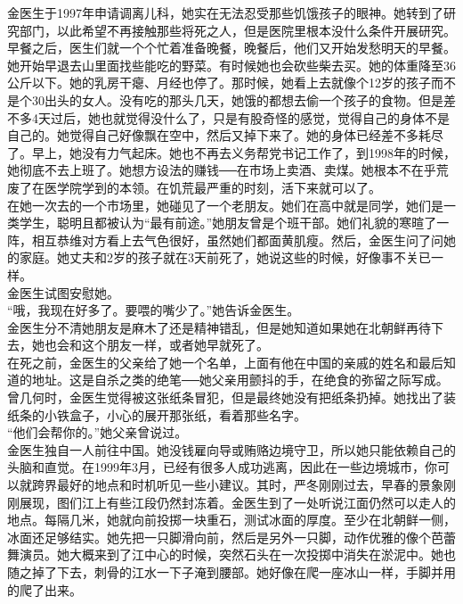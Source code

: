 金医生于1997年申请调离儿科，她实在无法忍受那些饥饿孩子的眼神。她转到了研究部门，以此希望不再接触那些将死之人，但是医院里根本没什么条件开展研究。早餐之后，医生们就一个个忙着准备晚餐，晚餐后，他们又开始发愁明天的早餐。她开始早退去山里面找些能吃的野菜。有时候她也会砍些柴去买。她的体重降至36公斤以下。她的乳房干瘪、月经也停了。那时候，她看上去就像个12岁的孩子而不是个30出头的女人。没有吃的那头几天，她饿的都想去偷一个孩子的食物。但是差不多4天过后，她也就觉得没什么了，只是有股奇怪的感觉，觉得自己的身体不是自己的。她觉得自己好像飘在空中，然后又掉下来了。她的身体已经差不多耗尽了。早上，她没有力气起床。她也不再去义务帮党书记工作了，到1998年的时候，她彻底不去上班了。她想方设法的赚钱──在市场上卖酒、卖煤。她根本不在乎荒废了在医学院学到的本领。在饥荒最严重的时刻，活下来就可以了。\\

在她一次去的一个市场里，她碰见了一个老朋友。她们在高中就是同学，她们是一类学生，聪明且都被认为“最有前途。”她朋友曾是个班干部。她们礼貌的寒暄了一阵，相互恭维对方看上去气色很好，虽然她们都面黄肌瘦。然后，金医生问了问她的家庭。她丈夫和2岁的孩子就在3天前死了，她说这些的时候，好像事不关已一样。\\

金医生试图安慰她。\\

“哦，我现在好多了。要喂的嘴少了。”她告诉金医生。\\

金医生分不清她朋友是麻木了还是精神错乱，但是她知道如果她在北朝鲜再待下去，她也会和这个朋友一样，或者她早就死了。\\

在死之前，金医生的父亲给了她一个名单，上面有他在中国的亲戚的姓名和最后知道的地址。这是自杀之类的绝笔──她父亲用颤抖的手，在绝食的弥留之际写成。曾几何时，金医生觉得被这张纸条冒犯，但是最终她没有把纸条扔掉。她找出了装纸条的小铁盒子，小心的展开那张纸，看着那些名字。\\

“他们会帮你的。”她父亲曾说过。\\

金医生独自一人前往中国。她没钱雇向导或贿赂边境守卫，所以她只能依赖自己的头脑和直觉。在1999年3月，已经有很多人成功逃离，因此在一些边境城市，你可以就跨界最好的地点和时机听见一些小建议。其时，严冬刚刚过去，早春的景象刚刚展现，图们江上有些江段仍然封冻着。金医生到了一处听说江面仍然可以走人的地点。每隔几米，她就向前投掷一块重石，测试冰面的厚度。至少在北朝鲜一侧，冰面还足够结实。她先把一只脚滑向前，然后是另外一只脚，动作优雅的像个芭蕾舞演员。她大概来到了江中心的时候，突然石头在一次投掷中消失在淤泥中。她也随之掉了下去，刺骨的江水一下子淹到腰部。她好像在爬一座冰山一样，手脚并用的爬了出来。\\

